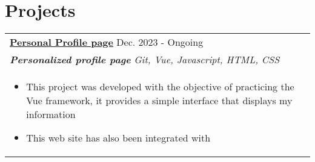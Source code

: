 \documentclass[a4paper,8pt]{article}
\begin{document}
\section{Projects}
\begin{tabularx}{\linewidth}{ @{}l r@{} }
\color[HTML]{1C033C} \textbf{\uline{\href{https://github.com/}{Personal Profile page}}} \hfill \color[HTML]{371e77} Dec. 2023 - Ongoing \\[4pt]
\color[HTML]{371e77}\textbf{\textit{Personalized profile page }} \hfill \color[HTML]{4B28A4} \textit{Git, Vue, Javascript, HTML, CSS} \\[5pt]
\begin{minipage}[t]{\linewidth}
    \begin{itemize}[nosep,after=\strut, leftmargin=2em, itemsep=2pt]
        \item This project was developed with the objective of practicing the Vue framework, it provides a simple interface that displays my information
        \item This web site has also been integrated with
    \end{itemize}
    \end{minipage}
\end{tabularx}

\end{document}
